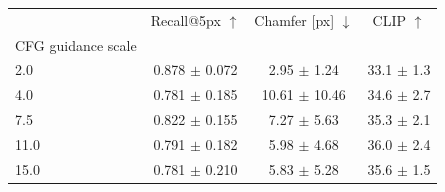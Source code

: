 \begin{tabular}{lccc}
\toprule
 & Recall@5px $\uparrow$ & Chamfer [px] $\downarrow$ & CLIP $\uparrow$ \\
CFG guidance scale &  &  &  \\
\midrule
2.0 & 0.878 $\pm$ 0.072 & 2.95 $\pm$ 1.24 & 33.1 $\pm$ 1.3 \\
4.0 & 0.781 $\pm$ 0.185 & 10.61 $\pm$ 10.46 & 34.6 $\pm$ 2.7 \\
7.5 & 0.822 $\pm$ 0.155 & 7.27 $\pm$ 5.63 & 35.3 $\pm$ 2.1 \\
11.0 & 0.791 $\pm$ 0.182 & 5.98 $\pm$ 4.68 & 36.0 $\pm$ 2.4 \\
15.0 & 0.781 $\pm$ 0.210 & 5.83 $\pm$ 5.28 & 35.6 $\pm$ 1.5 \\
\bottomrule
\end{tabular}
